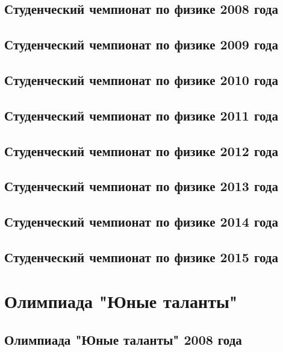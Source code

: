 \documentclass[a5paper, oneside]{book}
\begin{document}
\chapter{Студенческий чемпионат по физике 2008 года}


\chapter{Студенческий чемпионат по физике 2009 года}


\chapter{Студенческий чемпионат по физике 2010 года}


\chapter{Студенческий чемпионат по физике 2011 года}


\chapter{Студенческий чемпионат по физике 2012 года}


\chapter{Студенческий чемпионат по физике 2013 года}


\chapter{Студенческий чемпионат по физике 2014 года}


\chapter{Студенческий чемпионат по физике 2015 года}


\part{Олимпиада "Юные таланты"}

\chapter{Олимпиада "Юные таланты" 2008 года}

\end{document}
